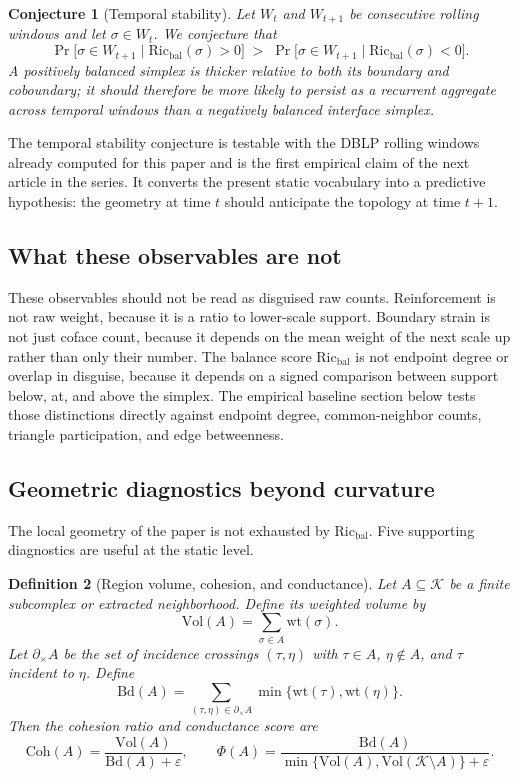 \documentclass[11pt]{article}
\newtheorem{definition}{Definition}[section]
\newtheorem{conjecture}[definition]{Conjecture}
\newcommand{\eps}{\varepsilon}
\newcommand{\K}{\mathcal{K}}
\newcommand{\wt}{\mathrm{wt}}
\newcommand{\Ric}{\mathrm{Ric}}
\begin{document}
\begin{conjecture}[Temporal stability]
\label{conj:persistence}
Let $W_t$ and $W_{t+1}$ be consecutive rolling windows and let $\sigma\in W_t$. We conjecture that
\[
\Pr\bigl[\sigma\in W_{t+1}\;\big|\;\Ric_{\mathrm{bal}}(\sigma)>0\bigr]
\;>\;
\Pr\bigl[\sigma\in W_{t+1}\;\big|\;\Ric_{\mathrm{bal}}(\sigma)<0\bigr].
\]
A positively balanced simplex is thicker relative to both its boundary and coboundary; it should therefore be more likely to persist as a recurrent aggregate across temporal windows than a negatively balanced interface simplex.
\end{conjecture}

The temporal stability conjecture is testable with the DBLP rolling windows already computed for this paper and is the first empirical claim of the next article in the series. It converts the present static vocabulary into a predictive hypothesis: the geometry at time $t$ should anticipate the topology at time $t+1$.

\subsection{What these observables are not}

These observables should not be read as disguised raw counts. Reinforcement is not raw weight, because it is a ratio to lower-scale support. Boundary strain is not just coface count, because it depends on the mean weight of the next scale up rather than only their number. The balance score $\Ric_{\mathrm{bal}}$ is not endpoint degree or overlap in disguise, because it depends on a signed comparison between support below, at, and above the simplex. The empirical baseline section below tests those distinctions directly against endpoint degree, common-neighbor counts, triangle participation, and edge betweenness.

\subsection{Geometric diagnostics beyond curvature}

The local geometry of the paper is not exhausted by $\Ric_{\mathrm{bal}}$. Five supporting diagnostics are useful at the static level.

\begin{definition}[Region volume, cohesion, and conductance]
Let $A \subseteq \K$ be a finite subcomplex or extracted neighborhood. Define its weighted volume by
\[
\mathrm{Vol}(A)=\sum_{\sigma \in A}\wt(\sigma).
\]
Let $\partial_\times A$ be the set of incidence crossings $(\tau,\eta)$ with $\tau \in A$, $\eta \notin A$, and $\tau$ incident to $\eta$. Define
\[
\mathrm{Bd}(A)=\sum_{(\tau,\eta)\in \partial_\times A}\min\{\wt(\tau),\wt(\eta)\}.
\]
Then the cohesion ratio and conductance score are
\[
\mathrm{Coh}(A)=\frac{\mathrm{Vol}(A)}{\mathrm{Bd}(A)+\eps},
\qquad
\Phi(A)=\frac{\mathrm{Bd}(A)}{\min\{\mathrm{Vol}(A),\mathrm{Vol}(\K \setminus A)\}+\eps}.
\]
\end{definition}
\end{document}
